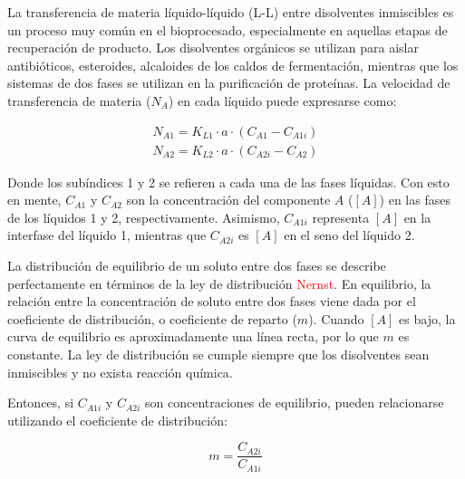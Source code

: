 \documentclass{AsignaturaResumen}
\begin{document}
La transferencia de materia líquido-líquido (L-L) entre disolventes inmiscibles es un proceso muy común en el bioprocesado, especialmente en aquellas etapas de recuperación de producto. Los disolventes orgánicos se utilizan para aislar antibióticos, esteroides, alcaloides de los caldos de fermentación, mientras que los sistemas de dos fases se utilizan en la purificación de proteínas. La velocidad de transferencia de materia ($N_{A}$) en cada líquido puede expresarse como:

\begin{gather}
    N_{A1} = K_{L1} \cdot a \cdot (C_{A1}  - C_{A1i})
    \\
    N_{A2} = K_{L2} \cdot a \cdot (C_{A2i} - C_{A2})
\end{gather}

Donde los subíndices 1 y 2 se refieren a cada una de las fases líquidas. Con esto en mente, $C_{A1}$ y $C_{A2}$ son la concentración del componente $A$ ($[A]$) en las fases de los líquidos 1 y 2, respectivamente. Asimismo, $C_{A1i}$ representa $[A]$ en la interfase del líquido 1, mientras que $C_{A2i}$ es $[A]$ en el seno del líquido 2.

La distribución  de equilibrio de un soluto entre dos fases se describe perfectamente en términos de la ley de distribución \textcolor{red}{Nernst}. En equilibrio, la relación entre la concentración de soluto entre dos fases viene dada por el coeficiente de distribución, o coeficiente de reparto ($m$). Cuando $[A]$ es bajo, la curva de equilibrio es aproximadamente una línea recta, por lo que $m$ es constante. La ley de distribución se cumple siempre que los disolventes sean inmiscibles y no exista reacción química.



Entonces, si $C_{A1i}$ y $C_{A2i}$ son concentraciones de equilibrio, pueden relacionarse utilizando el coeficiente de distribución:

\begin{equation}
    m = \frac{C_{A2i}}{C_{A1i}}
\end{equation}
\end{document}
